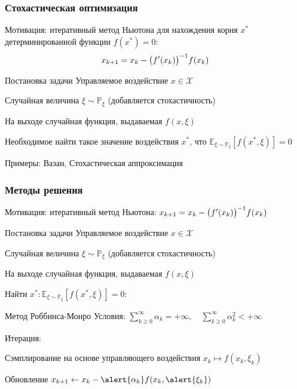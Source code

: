 \documentclass[notheorems]{beamer} %
\begin{document}
\begin{frame}
	\frametitle{Стохастическая оптимизация}
	Мотивация: итеративный метод Ньютона для нахождения корня $x^*$ детерминированной функции $f(x^*) = 0$:
		$$ x_{k+1} = x_k - \big{(} f'(x_k) \big{)}^{-1} f(x_k) $$
	
	\begin{block}{Постановка задачи}
		Управляемое воздействие  $x \in \mathcal{X}$
		
		Случайная величина $\xi \sim \mathbb{P}_\xi$ (добавляется стохастичность)
		
	    На выходе случайная функция, выдаваемая  $f(x, \xi)$
	    
	    Необходимое найти такое значение воздействия $x^*$, что $\mathbb{E}_{\xi \sim \mathbb{P}_\xi}[ f(x^*, \xi) ] = 0$
	\end{block}

Примеры: Вазан, Стохастическая аппроксимация

\end{frame}

\begin{frame}
	\frametitle{Методы решения}
		Мотивация: итеративный метод Ньютона:
	$ x_{k+1} = x_k - \big{(} f'(x_k) \big{)}^{-1} f(x_k) $
		\begin{block}{Постановка задачи}
		Управляемое воздействие  $x \in \mathcal{X}$
		
		Случайная величина $\xi \sim \mathbb{P}_\xi$ (добавляется стохастичность)
		
		На выходе случайная функция, выдаваемая  $f(x, \xi)$
		
		Найти $x^* : \mathbb{E}_{\xi \sim \mathbb{P}_\xi}[ f(x^*, \xi) ] = 0$:
	\end{block}
	
	\begin{block}{Метод Роббинса-Монро}
		Условия:
		$\sum_{k \ge 0}^{\infty} \alpha_k = +\infty, \quad \sum_{k \ge 0}^{\infty} \alpha_k^2 < +\infty$
		
		Итерация:
				
		Сэмплирование на основе управляющего воздействия $ x_k \mapsto f(x_k, \xi_k)  $ 
		
		Обновление $ x_{k+1} \leftarrow x_k  - \alert{\alpha_k} f(x_k, \alert{\xi_k}) $
	\end{block}

	
\end{frame}

\end{document}
